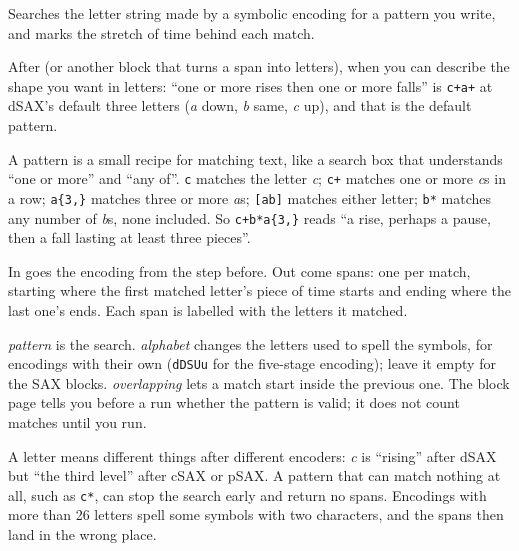 Searches the letter string made by a symbolic encoding for a pattern you write, and marks
the stretch of time behind each match.

After  (or another block that turns a span into letters), when
you can describe the shape you want in letters: ``one or more rises then one or more falls''
is \texttt{c+a+} at dSAX's default three letters (\emph{a} down, \emph{b} same, \emph{c}
up), and that is the default pattern.

\begin{plainterms}
A pattern is a small recipe for matching text, like a search box that understands
``one or more'' and ``any of''. \texttt{c} matches the letter \emph{c};
\texttt{c+} matches one or more \emph{c}s in a row; \texttt{a\{3,\}} matches three or more
\emph{a}s; \texttt{[ab]} matches either letter; \texttt{b*} matches any number of \emph{b}s,
none included. So \texttt{c+b*a\{3,\}} reads ``a rise, perhaps a pause, then a fall lasting
at least three pieces''.
\end{plainterms}

In goes the encoding from the step before. Out come spans: one per match, starting where
the first matched letter's piece of time starts and ending where the last one's ends. Each
span is labelled with the letters it matched.

\emph{pattern} is the search. \emph{alphabet} changes the letters used to spell the
symbols, for encodings with their own (\texttt{dDSUu} for the five-stage encoding); leave it
empty for the SAX blocks. \emph{overlapping} lets a match start inside the previous one.
The block page tells you before a run whether the pattern is valid; it does not count
matches until you run.

A letter means different things after different encoders: \emph{c} is ``rising'' after dSAX
but ``the third level'' after cSAX or pSAX. A pattern that can match nothing at all, such
as \texttt{c*}, can stop the search early and return no spans. Encodings with more than 26
letters spell some symbols with two characters, and the spans then land in the wrong place.
